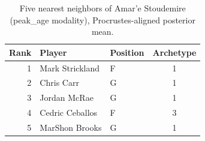 \begin{table}[htbp]
  \centering\small
  \begin{tabular}{rllc}
    \toprule
    Rank & Player & Position & Archetype \\
    \midrule
    1 & Mark Strickland & F & 1 \\
    2 & Chris Carr & G & 1 \\
    3 & Jordan McRae & G & 1 \\
    4 & Cedric Ceballos & F & 3 \\
    5 & MarShon Brooks & G & 1 \\
    \bottomrule
  \end{tabular}
  \caption{Five nearest neighbors of Amar'e Stoudemire (peak_age modality), Procrustes-aligned posterior mean.}
  \label{tab:Amar_e_Stoudemire_neighbors_peak_age}
\end{table}

